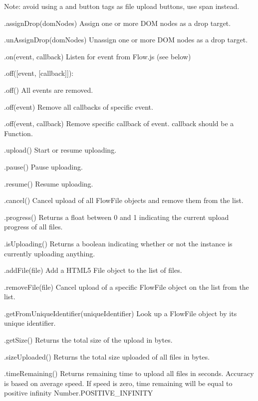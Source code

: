 \begin{DoxyItemize}
\begin{DoxyItemize}
Note\+: avoid using {\ttfamily a} and {\ttfamily button} tags as file upload buttons, use span instead.
\end{DoxyItemize}
\item {\ttfamily .assign\+Drop(dom\+Nodes)} Assign one or more D\+OM nodes as a drop target.
\item {\ttfamily .un\+Assign\+Drop(dom\+Nodes)} Unassign one or more D\+OM nodes as a drop target.
\item {\ttfamily .on(event, callback)} Listen for event from Flow.\+js (see below)
\item {\ttfamily .off(\mbox{[}event, \mbox{[}callback\mbox{]}\mbox{]})}\+:
\begin{DoxyItemize}
\item {\ttfamily .off()} All events are removed.
\item {\ttfamily .off(event)} Remove all callbacks of specific event.
\item {\ttfamily .off(event, callback)} Remove specific callback of event. {\ttfamily callback} should be a {\ttfamily Function}.
\end{DoxyItemize}
\item {\ttfamily .upload()} Start or resume uploading.
\item {\ttfamily .pause()} Pause uploading.
\item {\ttfamily .resume()} Resume uploading.
\item {\ttfamily .cancel()} Cancel upload of all {\ttfamily Flow\+File} objects and remove them from the list.
\item {\ttfamily .progress()} Returns a float between 0 and 1 indicating the current upload progress of all files.
\item {\ttfamily .is\+Uploading()} Returns a boolean indicating whether or not the instance is currently uploading anything.
\item {\ttfamily .add\+File(file)} Add a H\+T\+M\+L5 File object to the list of files.
\item {\ttfamily .remove\+File(file)} Cancel upload of a specific {\ttfamily Flow\+File} object on the list from the list.
\item {\ttfamily .get\+From\+Unique\+Identifier(unique\+Identifier)} Look up a {\ttfamily Flow\+File} object by its unique identifier.
\item {\ttfamily .get\+Size()} Returns the total size of the upload in bytes.
\item {\ttfamily .size\+Uploaded()} Returns the total size uploaded of all files in bytes.
\item {\ttfamily .time\+Remaining()} Returns remaining time to upload all files in seconds. Accuracy is based on average speed. If speed is zero, time remaining will be equal to positive infinity {\ttfamily Number.\+P\+O\+S\+I\+T\+I\+V\+E\+\_\+\+I\+N\+F\+I\+N\+I\+TY}
\end{DoxyItemize}

